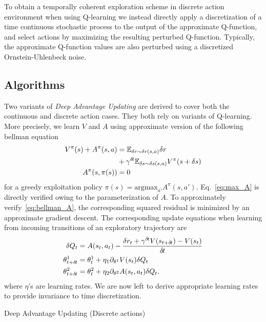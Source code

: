 \documentclass{article}
\begin{document}
To obtain a temporally coherent exploration scheme in discrete action environment
when using Q-learning we instead directly apply a discretization of a time continuous
stochastic process to the output of the approximate Q-function, and select actions
by maximizing the resulting perturbed Q-function. Typically, the approximate Q-function
values are also perturbed using a discretized Ornstein-Uhlenbeck noise.

\subsection{Algorithms}
\label{subsec:algorithm}
Two variants of \emph{Deep Advantage Updating} are derived to cover both the continuous
and discrete action cases. They both rely on variants of Q-learning. More precisely,
we learn $V$ and $A$ using approximate version of the following bellman equation
\begin{align}
	V^{\pi}(s) + A^{\pi}(s, a) &= \mathbb{E}_{\delta r \sim \delta r(s, a)}\delta r\nonumber\\ 
				   &+ \gamma^{\delta\hspace{-.1em}t}  \mathbb{E}_{\delta s \sim \delta s(s, a)} V^{\pi}(s + \delta s)\label{eq:bellman_A}\\
	A^{\pi}(s, \pi(s)) &= 0\label{eq:max_A}
\end{align}
for a greedy exploitation policy $\pi(s) = \text{argmax}_{a'}A^\pi(s, a')$.
Eq.~\eqref{eq:max_A} is directly verified owing to the parameterization of $A$.
To approximately verify~\eqref{eq:bellman_A}, the corresponding squared residual
is minimized by an approximate gradient descent.
The corresponding update equations when learning from incoming transitions of
an exploratory trajectory are
\begin{align}
	\delta Q_t &= A(s_t, a_t) - \frac{\delta r_t + \gamma^{\delta\hspace{-.1em}t} V(s_{t+\delta\hspace{-.1em}t}) - V(s_t)}{\delta\hspace{-.1em}t}\\
	\theta^1_{t+\delta\hspace{-.1em}t} &= \theta^1_t + \eta_1 \partial_{\theta^1} V(s_t) \delta Q_t\\
	\theta^2_{t+\delta\hspace{-.1em}t} &= \theta^2_t + \eta_2 \partial_{\theta^2} A(s_t, a_t) \delta Q_t.
	\label{eq:approx_bellman_A}
\end{align}
where $\eta$'s are learning rates. We are now left to derive appropriate learning rates
to provide invariance to time discretization.
\begin{algorithm}[ht]
	\caption{Deep Advantage Updating (Discrete actions)}
	
\end{algorithm}
\end{document}
